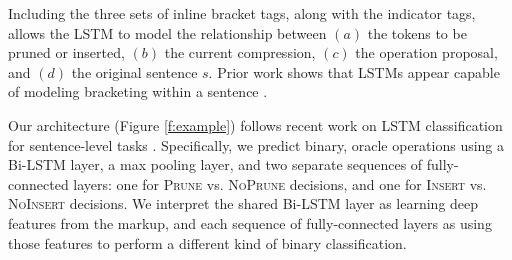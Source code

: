 \documentclass[11pt,a4paper]{article}
\begin{document}
Including the three sets of inline bracket tags, along with the indicator tags, allows the LSTM to model the relationship between $(a)$ the tokens to be pruned or inserted, $(b)$ the current compression, $(c)$ the operation proposal, and $(d)$ the original sentence $s$. Prior work shows that LSTMs appear capable of modeling bracketing within a sentence \cite{Vinyals2015GrammarAA,karpathy,Aharoni2017TowardsSN}.

Our architecture (Figure \ref{f:example}) follows recent work on LSTM classification for sentence-level tasks \cite{D17-1070}. Specifically, we predict binary, oracle operations using a Bi-LSTM layer, a max pooling layer, and two separate sequences of fully-connected layers: one for \textsc{Prune} vs. \textsc{NoPrune} decisions, and one for \textsc{Insert} vs. \textsc{NoInsert} decisions. We interpret the shared Bi-LSTM layer as learning deep features from the markup, and each sequence of fully-connected layers as using those features to perform a different kind of binary classification.






\end{document}
